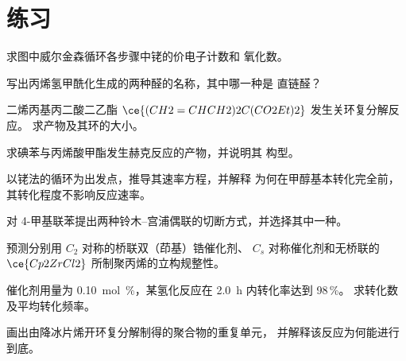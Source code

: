 \section{练习}

\begin{exercise}[$\star$]\label{exo:b3:homogeneous-catalysis:1}
求图中威尔金森循环各步骤中铑的价电子计数和
氧化数。
\end{exercise}

\begin{exercise}[$\star$]\label{exo:b3:homogeneous-catalysis:2}
写出丙烯氢甲酰化生成的两种醛的名称，其中哪一种是
直链醛？
\end{exercise}

\begin{exercise}[$\star$]\label{exo:b3:homogeneous-catalysis:3}
二烯丙基丙二酸二乙酯 $\ce{(CH2=CHCH2)2C(CO2Et)2}$ 发生关环复分解反应。
求产物及其环的大小。
\end{exercise}

\begin{exercise}[$\star$]\label{exo:b3:homogeneous-catalysis:4}
求碘苯与丙烯酸甲酯发生赫克反应的产物，并说明其
构型。
\end{exercise}

\begin{exercise}[$\star\star$]\label{exo:b3:homogeneous-catalysis:5}
以铑法的循环为出发点，推导其速率方程，并解释
为何在甲醇基本转化完全前，其转化程度不影响反应速率。
\end{exercise}

\begin{exercise}[$\star\star$]\label{exo:b3:homogeneous-catalysis:6}
对 4-甲基联苯提出两种铃木–宫浦偶联的切断方式，并选择其中一种。
\end{exercise}

\begin{exercise}[$\star\star$]\label{exo:b3:homogeneous-catalysis:7}
预测分别用 $C_2$ 对称的桥联双（茚基）锆催化剂、
$C_s$ 对称催化剂和无桥联的 $\ce{Cp2ZrCl2}$ 所制聚丙烯的立构规整性。
\end{exercise}

\begin{exercise}[$\star\star$]\label{exo:b3:homogeneous-catalysis:8}
催化剂用量为 \qty{0.10}{mol\%}，某氢化反应在 \qty{2.0}{h} 内转化率达到 98\,\%。
求转化数及平均转化频率。
\end{exercise}

\begin{exercise}[$\star\star$]\label{exo:b3:homogeneous-catalysis:9}
画出由降冰片烯开环复分解制得的聚合物的重复单元，
并解释该反应为何能进行到底。
\end{exercise}

